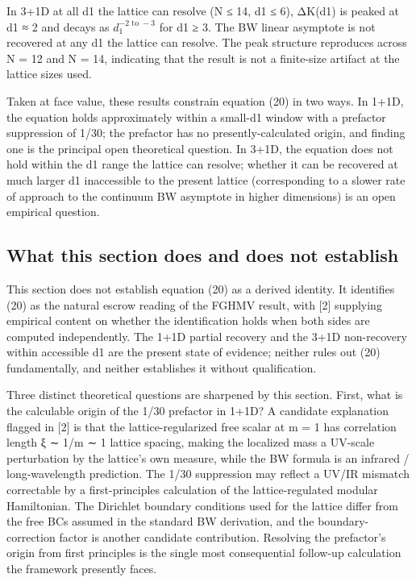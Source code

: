\documentclass[11pt]{article}
\begin{document}
In 3+1D at all d1 the lattice can resolve (N ≤ 14, d1 ≤ 6), ΔK(d1) is
peaked at d1 ≈ 2 and decays as $d_1^{-2\text{ to }-3}$ for d1 ≥ 3. The BW linear
asymptote is not recovered at any d1 the lattice can resolve. The peak
structure reproduces across N = 12 and N = 14, indicating that the
result is not a finite-size artifact at the lattice sizes used.

Taken at face value, these results constrain equation (20) in two ways.
In 1+1D, the equation holds approximately within a small-d1 window with
a prefactor suppression of 1/30; the prefactor has no
presently-calculated origin, and finding one is the principal open
theoretical question. In 3+1D, the equation does not hold within the d1
range the lattice can resolve; whether it can be recovered at much
larger d1 inaccessible to the present lattice (corresponding to a slower
rate of approach to the continuum BW asymptote in higher dimensions) is
an open empirical question.


\subsection{What this section does and does not establish}

This section does not establish equation (20) as a derived identity. It
identifies (20) as the natural escrow reading of the FGHMV result, with
[2] supplying empirical content on whether the identification holds
when both sides are computed independently. The 1+1D partial recovery
and the 3+1D non-recovery within accessible d1 are the present state of
evidence; neither rules out (20) fundamentally, and neither establishes
it without qualification.

Three distinct theoretical questions are sharpened by this section.
First, what is the calculable origin of the 1/30 prefactor in 1+1D? A
candidate explanation flagged in [2] is that the lattice-regularized
free scalar at m = 1 has correlation length ξ ∼ 1/m ∼ 1 lattice spacing,
making the localized mass a UV-scale perturbation by the lattice's own
measure, while the BW formula is an infrared / long-wavelength
prediction. The 1/30 suppression may reflect a UV/IR mismatch
correctable by a first-principles calculation of the lattice-regulated
modular Hamiltonian. The Dirichlet boundary conditions used for the
lattice differ from the free BCs assumed in the standard BW derivation,
and the boundary-correction factor is another candidate contribution.
Resolving the prefactor's origin from first principles is the single
most consequential follow-up calculation the framework presently faces.
\end{document}
